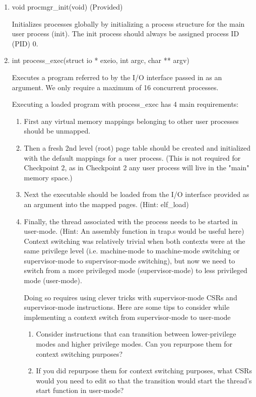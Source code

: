 \documentclass{article}
\begin{document}
	\begin{enumerate}

		\item{{\fix void procmgr\_init(void)} (Provided)} 

		
		Initializes processes globally by initializing a process
		structure for the main user process (init). The init process
		should always be assigned process ID (PID) 0.

		\item{{\fix int process\_exec(struct io * exeio, int argc, char ** argv)}}
		
		Executes a program referred to by the I/O interface
		passed in as an argument. We only require a maximum of 16 concurrent processes.
		
		Executing a loaded program with {\fix process\_exec} has 4 main requirements:
		\begin{enumerate}
		    \item First any virtual memory mappings belonging to other user processes should be unmapped.
		    \item Then a fresh 2nd level (root) page table should be created and initialized with the default mappings for a user process. (This is not required for Checkpoint 2, as in Checkpoint 2 any user process will live in the "main" memory space.)
		    \item Next the executable should be loaded from the I/O interface provided as an argument into the mapped pages. (Hint: {\fix elf\_load})
		    \item Finally, the thread associated with the process needs to be started in user-mode. (Hint: An assembly function in {\fix trap.s} would be useful here) \\ 
		    
		    Context switching was relatively trivial when both contexts
		    were at the same privilege level (i.e. machine-mode to machine-mode switching or supervisor-mode to supervisor-mode switching), but now we 
		    need to switch from a more privileged mode (supervisor-mode) to less privileged mode (user-mode).
		    
		    Doing so requires using clever tricks with supervisor-mode CSRs and supervisor-mode instructions.
		    Here are some tips to consider while implementing a context switch from supervisor-mode to user-mode
		    
		    \begin{enumerate}
		        \item Consider instructions that can transition between lower-privilege modes and higher privilege modes. Can you repurpose them for
		        context switching purposes?
		        \item If you did repurpose them for context switching purposes, what CSRs would you need to edit so that the transition would start the
		        thread's start function in user-mode?
		    \end{enumerate}
		\end{enumerate}
		

\end{enumerate}
\end{document}
